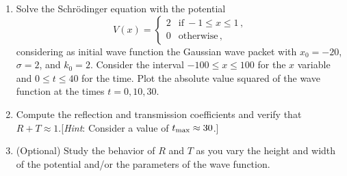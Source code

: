 \begin{exercise}
	\begin{enumerate}
		\item Solve the Schr\"odinger equation with the potential
		      \[
			      V(x)=
			      \begin{cases}
				      2 & \text{if}\  -1 \leq x \leq 1\,, \\[2ex]
				      0 & \text{otherwise}\,,
			      \end{cases}
		      \]
		      considering as initial wave function the Gaussian wave packet with
		      $x_0=-20$, $\sigma=2$, and $k_0=2$. Consider the interval $-100\leq x\leq 100$
		      for the $x$ variable and $0\leq t\leq 40$ for the time. Plot the absolute value
		      squared of the wave function at the times $t=0,10,30$.
		\item Compute the reflection and transmission coefficients and verify
		      that $R+T\approx 1$.[\emph{Hint}: Consider a value of $t_{\rm max}\approx 30$.]
		\item (Optional) Study the behavior of $R$ and $T$ as you vary
		      the height and width of the potential and/or the parameters of the wave
		      function.
	\end{enumerate}
\end{exercise}

